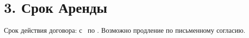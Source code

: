 \section*{3. Срок Аренды}
Срок действия договора: с \Rentstartdate\ по \Rentenddate. Возможно продление по письменному согласию.

